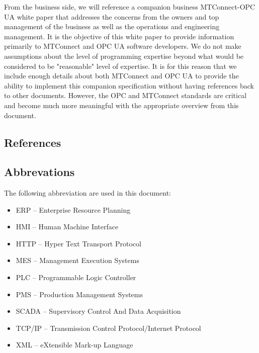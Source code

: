 From the business side, we will reference a companion business MTConnect-OPC UA white paper that addresses the concerns from the owners and top management of the business as well as the operations and engineering management. It is the objective of this white paper to provide information primarily to MTConnect and OPC UA software developers. We do not make assumptions about the level of programming expertise beyond what would be considered to be "reasonable" level of expertise. It is for this reason that we include enough details about both MTConnect and OPC UA to provide the ability to implement this companion specification without having references back to other documents. However, the OPC and MTConnect standards are critical and become much more meaningful with the appropriate overview from this document.

\subsection{References}

\printbibliography[title=OPC UA References,keyword=OPC]

\printbibliography[title=MTConnect References,keyword=MTC]

\subsection{Abbrevations}

The following abbreviation are used in this document:

\begin{itemize}
    \item ERP -- Enterprise Resource Planning
    \item HMI -- Human Machine Interface
    \item HTTP -- Hyper Text Transport Protocol
    \item MES -- Management Execution Systems
    \item PLC -- Programmable Logic Controller
    \item PMS -- Production Management Systems
    \item SCADA -- Supervisory Control And Data Acquisition
    \item TCP/IP -- Transmission Control Protocol/Internet Protocol
    \item XML -- eXtensible Mark-up Language
\end{itemize}

